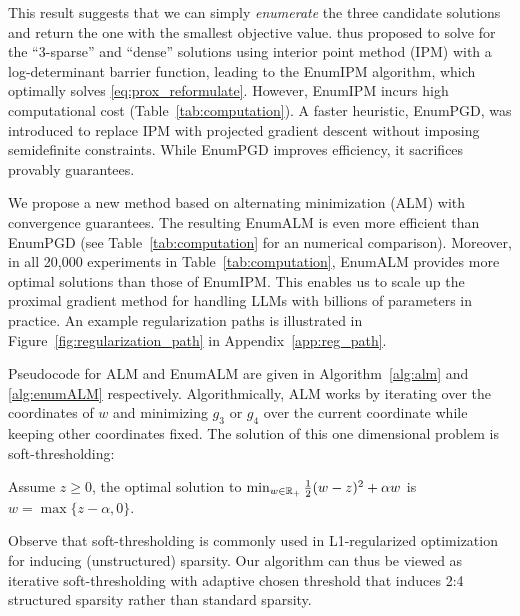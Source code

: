 This result suggests that we can simply \emph{enumerate} the three candidate solutions and return the one with the smallest objective value. \citet{ann_paper} thus proposed to solve for the ``3-sparse'' and ``dense'' solutions using interior point method (IPM) with a log-determinant barrier function, leading to the \textsf{EnumIPM} algorithm, which optimally solves \eqref{eq:prox_reformulate}. However, \textsf{EnumIPM} incurs high computational cost (Table~\ref{tab:computation}). A faster heuristic, \textsf{EnumPGD}, was introduced to replace IPM with projected gradient descent without imposing semidefinite constraints. While \textsf{EnumPGD} improves efficiency, it sacrifices provably guarantees. 





We propose a new method based on alternating minimization (ALM) with convergence guarantees. The resulting \textsf{EnumALM} is even more efficient than \textsf{EnumPGD} (see Table~\ref{tab:computation} for an numerical comparison). Moreover, in all 20,000 experiments in Table~\ref{tab:computation}, \textsf{EnumALM} provides more optimal solutions than those of \textsf{EnumIPM}. This enables us to scale up the proximal gradient method for handling LLMs with billions of parameters in practice. An example regularization paths is illustrated in Figure~\ref{fig:regularization_path} in Appendix~\ref{app:reg_path}.

Pseudocode for \textsf{ALM} and \textsf{EnumALM} are given in Algorithm~\ref{alg:alm} and \ref{alg:enumALM} respectively. Algorithmically, ALM works by iterating over the coordinates of $w$ and minimizing $g_3$ or $g_4$ over the current coordinate while keeping other coordinates fixed. The solution of this one dimensional problem is soft-thresholding:
\begin{fact}
Assume $z\geq 0$, the optimal solution to $\min_{w\in \mathbb{R}_+}  \frac{1}{2}(w-z)^2 + \alpha w$ is
$w = \max\{z-\alpha,0\}$.
\end{fact}
Observe that soft-thresholding is commonly used in L1-regularized optimization for inducing (unstructured) sparsity.  Our algorithm can thus be viewed as iterative soft-thresholding with adaptive chosen threshold that induces 2:4 structured sparsity rather than standard sparsity.

